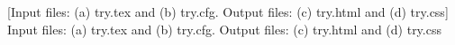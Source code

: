 [Input files: (a) try.tex and (b) try.cfg. Output files: (c) try.html and (d) try.css]{%
 Input files: (a) try.tex and (b) try.cfg. Output files: (c) try.html and (d) try.css
}%

